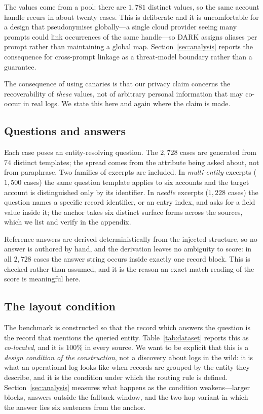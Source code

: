 The values come from a pool: there are $1{,}781$ distinct values, so the same account handle
recurs in about twenty cases. This is deliberate and it is uncomfortable for a design that
pseudonymises globally---a single cloud provider seeing many prompts could link occurrences
of the same handle---so \textsc{DARK} assigns aliases per prompt rather than maintaining a
global map. Section~\ref{sec:analysis} reports the consequence for cross-prompt linkage as a
threat-model boundary rather than a guarantee.

The consequence of using canaries is that our privacy claim concerns the recoverability of
\emph{these} values, not of arbitrary personal information that may co-occur in real logs.
We state this here and again where the claim is made.

\subsection{Questions and answers}

Each case poses an entity-resolving question. The $2{,}728$ cases are generated from $74$
distinct templates; the spread comes from the attribute being asked about, not from
paraphrase. Two families of excerpts are included. In \emph{multi-entity} excerpts ($1{,}500$
cases) the same question template applies to six accounts and the target account is
distinguished only by its identifier. In \emph{needle} excerpts ($1{,}228$ cases) the
question names a specific record identifier, or an entry index, and asks for a field value
inside it; the anchor takes six distinct surface forms across the sources, which we list and
verify in the appendix.

Reference answers are derived deterministically from the injected structure, so no answer is
authored by hand, and the derivation leaves no ambiguity to score: in all $2{,}728$ cases the
answer string occurs inside exactly one record block. This is checked rather than assumed, and
it is the reason an exact-match reading of the score is meaningful here.

\subsection{The layout condition}

The benchmark is constructed so that the record which answers the question is the record that
mentions the queried entity. Table~\ref{tab:dataset} reports this as \emph{co-located}, and it
is $100\%$ in every source. We want to be explicit that this is a \emph{design condition of the
construction}, not a discovery about logs in the wild: it is what an operational log looks
like when records are grouped by the entity they describe, and it is the condition under which
the routing rule is defined. Section~\ref{sec:analysis} measures what happens as the condition
weakens---larger blocks, answers outside the fallback window, and the two-hop variant in which
the answer lies six sentences from the anchor.

